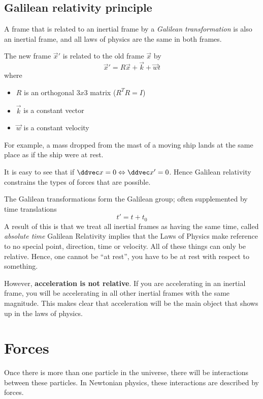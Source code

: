 \documentclass{article}
\numberwithin{equation}{section}
\begin{document}
\subsection{Galilean relativity principle}
A frame that is related to an inertial frame by a \emph{Galilean transformation} is also an inertial frame,
and all laws of physics are the same in both frames.

\begin{defi}
    The new frame $\vec x'$ is related to the old frame $\vec x$ by 
    \[\vec x' = R \vec x + \vec k + \vec w t\]
    where
    \begin{itemize}
        \item $R$ is an orthogonal $3x3$ matrix ($R^TR = I$)
        \item $\vec k$ is a constant vector
        \item $\vec w$ is a constant velocity
    \end{itemize}
\end{defi}

For example, a mass dropped from the mast of a moving ship lands at the same place as if the ship were at rest.

It is easy to see that if $\ddvec x = 0 \Leftrightarrow \ddvec x' = 0$.
Hence Galilean relativity constrains the types of forces that are possible.

The Galilean transformations form the Galilean group; often supplemented by time translations
\[t' = t + t_0\]
A result of this is that we treat all inertial frames as having the same time, called \emph{absolute time}
Galilean Relativity implies that the Laws of Physics make reference to no special point, direction, time or velocity.
All of these things can only be relative.
Hence, one cannot be ``at rest'', you have to be at rest with respect to something.

However, \textbf{acceleration is not relative}.
If you are accelerating in an inertial frame, you will be accelerating in all other inertial frames with the same magnitude.
This makes clear that acceleration will be the main object that shows up in the laws of physics.

\section{Forces}
Once there is more than one particle in the universe, there will be interactions between these particles.
In Newtonian physics, these interactions are described by forces.
\end{document}
